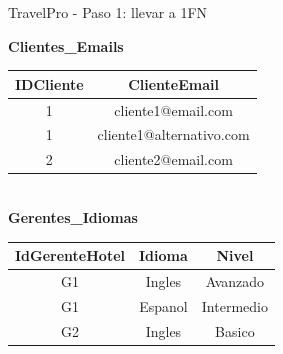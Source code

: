 \documentclass{beamer}
\begin{document}
\begin{frame}{TravelPro - Paso 1: llevar a 1FN}
    \begin{center}
    \textbf{Clientes\_Emails}\\[0.1cm]
    \begin{tabular}{cc}
        \hline
        IDCliente & ClienteEmail \\
        \hline
        1 & cliente1@email.com \\
        1 & cliente1@alternativo.com \\
        2 & cliente2@email.com \\
        \hline
    \end{tabular}
    \vspace{0.6cm}
    \textbf{\\Gerentes\_Idiomas}\\[0.1cm]
    \begin{tabular}{ccc}
        \hline
        IdGerenteHotel & Idioma & Nivel \\
        \hline
        G1 & Ingles & Avanzado \\
        G1 & Espanol & Intermedio \\
        G2 & Ingles & Basico \\
        \hline
    \end{tabular}
    \end{center}
\end{frame}
\end{document}
